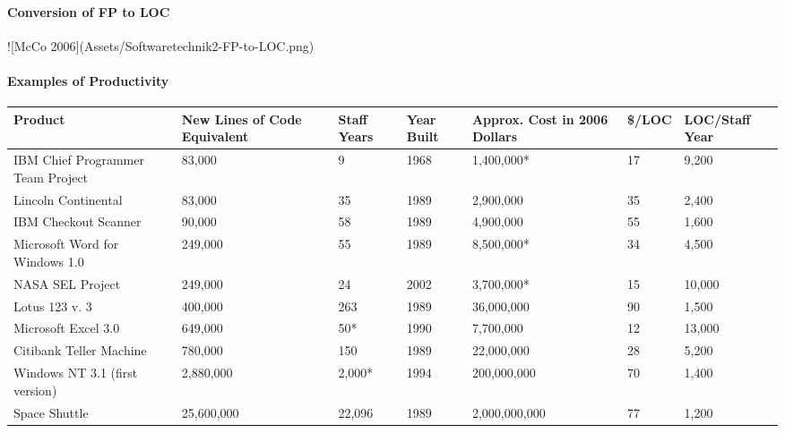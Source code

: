 \documentclass[a4paper]{article}
\begin{document}
\begin{multicols}{3}
  
  \paragraph{Conversion of FP to LOC}
  ![McCo 2006](Assets/Softwaretechnik2-FP-to-LOC.png)
  
  \paragraph{Examples of Productivity}
  \begin{tabular}{l|l|l|l|l|l|l}
   Product                           & New Lines of Code Equivalent & Staff Years & Year Built & Approx. Cost in 2006 Dollars & \$/LOC & LOC/Staff Year \\\hline
   IBM Chief Programmer Team Project & 83,000                       & 9           & 1968       & 1,400,000*                   & 17   & 9,200          \\
   Lincoln Continental               & 83,000                       & 35          & 1989       & 2,900,000                    & 35   & 2,400          \\
   IBM Checkout Scanner              & 90,000                       & 58          & 1989       & 4,900,000                    & 55   & 1,600          \\
   Microsoft Word for Windows 1.0    & 249,000                      & 55          & 1989       & 8,500,000*                   & 34   & 4,500          \\
   NASA SEL Project                  & 249,000                      & 24          & 2002       & 3,700,000*                   & 15   & 10,000         \\
   Lotus 123 v. 3                    & 400,000                      & 263         & 1989       & 36,000,000                   & 90   & 1,500          \\
   Microsoft Excel 3.0               & 649,000                      & 50*         & 1990       & 7,700,000                    & 12   & 13,000         \\
   Citibank Teller Machine           & 780,000                      & 150         & 1989       & 22,000,000                   & 28   & 5,200          \\
   Windows NT 3.1 (first version)    & 2,880,000                    & 2,000*      & 1994       & 200,000,000                  & 70   & 1,400          \\
   Space Shuttle                     & 25,600,000                   & 22,096      & 1989       & 2,000,000,000                & 77   & 1,200          \\
  \end{tabular}
  

\end{multicols}
\end{document}
